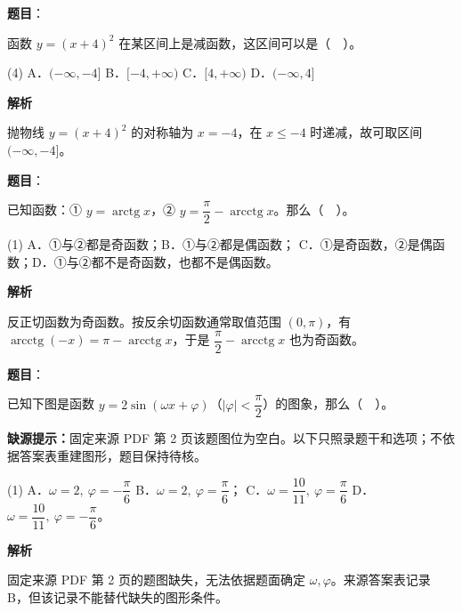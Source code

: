 \begin{answer}

\textbf{题目}：

函数 $y=(x+4)^2$ 在某区间上是减函数，这区间可以是（　）。

\begin{gkopts}(4)
\task A．$(-\infty,-4]$
\task B．$[-4,+\infty)$
\task C．$[4,+\infty)$
\task D．$(-\infty,4]$
\end{gkopts}

\textbf{解析}

抛物线 $y=(x+4)^2$ 的对称轴为 $x=-4$，在 $x\le-4$ 时递减，故可取区间 $(-\infty,-4]$。


\end{answer}
\begin{answer}

\textbf{题目}：

已知函数：① $y=\operatorname{arctg}x$，② $y=\dfrac\pi2-\operatorname{arcctg}x$。那么（　）。

\begin{gkopts}(1)
\task A．①与②都是奇函数；B．①与②都是偶函数；
\task C．①是奇函数，②是偶函数；D．①与②都不是奇函数，也都不是偶函数。
\end{gkopts}

\textbf{解析}

反正切函数为奇函数。按反余切函数通常取值范围 $(0,\pi)$，有 $\operatorname{arcctg}(-x)=\pi-\operatorname{arcctg}x$，于是 $\dfrac\pi2-\operatorname{arcctg}x$ 也为奇函数。


\end{answer}
\begin{answer}

\textbf{题目}：

已知下图是函数 $y=2\sin(\omega x+\varphi)$（$|\varphi|<\dfrac\pi2$）的图象，那么（　）。

\begin{gktip}
\textbf{缺源提示：}固定来源 PDF 第 2 页该题图位为空白。以下只照录题干和选项；不依据答案表重建图形，题目保持待核。
\end{gktip}

\begin{gkopts}(1)
\task A．$\omega=2,\ \varphi=-\dfrac\pi6$
\task B．$\omega=2,\ \varphi=\dfrac\pi6$；
\task C．$\omega=\dfrac{10}{11},\ \varphi=\dfrac\pi6$
\task D．$\omega=\dfrac{10}{11},\ \varphi=-\dfrac\pi6$。
\end{gkopts}

\textbf{解析}

固定来源 PDF 第 2 页的题图缺失，无法依据题面确定 $\omega,\varphi$。来源答案表记录 B，但该记录不能替代缺失的图形条件。


\end{answer}
